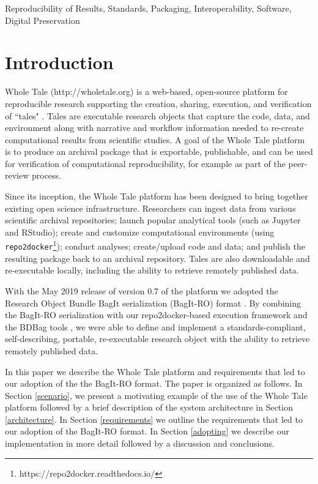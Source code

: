 \documentclass[conference]{IEEEtran}
\begin{document}
\begin{IEEEkeywords}
Reproducibility of Results, Standards, Packaging, Interoperability, Software, Digital Preservation
\end{IEEEkeywords}

\section{Introduction}

Whole Tale (http://wholetale.org) is a web-based, open-source platform for reproducible research 
supporting the creation, sharing, execution, and verification of ``tales" \cite{brinckman2019, chard2019}. Tales are executable research objects that capture the code, data, and environment along with narrative and workflow information needed to re-create computational results from scientific studies. A goal of the Whole Tale platform is to produce an archival package that is exportable, publishable, and can be used for verification of computational reproducibility, for example as part of the peer-review process.

Since its inception, the Whole Tale platform has been designed to bring together existing open 
science infrastructure.  Researchers can ingest data from various scientific archival 
repositories; launch popular analytical tools (such as Jupyter and RStudio); create and customize 
computational environments (using \texttt{repo2docker}\footnote{https://repo2docker.readthedocs.io/}); 
conduct analyses; create/upload code and data; and publish the resulting package back to an
archival repository. Tales are also downloadable and re-executable locally, including the 
ability to retrieve remotely published data.  

With the May 2019 release of version 0.7 of the platform we adopted the Research Object Bundle BagIt serialization (BagIt-RO) format \cite{soilandreyes2014}. By combining the BagIt-RO 
serialization with our repo2docker-based execution framework and the BDBag tools 
\cite{chard2016}, we were able to define and implement a standards-compliant, self-describing, 
portable, re-executable research object with the ability to retrieve remotely published data.  

In this paper we describe the Whole Tale platform and requirements that led to our adoption of the
the BagIt-RO format. The paper is organized as follows. In Section \ref{scenario}, we present a 
motivating example of the  use of the Whole Tale platform followed by a brief description of the 
system architecture in Section \ref{architecture}. In Section \ref{requirements} we outline the 
requirements that led to our adoption of the BagIt-RO format. In Section \ref{adopting} we describe
our implementation in more detail followed by a discussion and conclusions.
\end{document}
